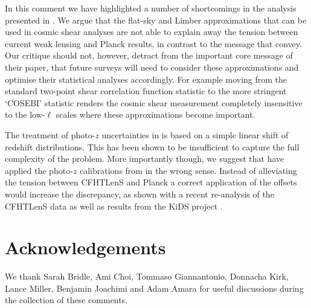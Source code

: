 In this comment we have highlighted a number of shortcomings in the analysis presented in \cite{kitching/etal:2016}.  We argue that the flat-sky and Limber approximations that can be used in cosmic shear analyses are not able to explain away the tension between current weak lensing and Planck results, in contrast to the message that \cite{kitching/etal:2016} convey.  Our critique should not, however, detract from the important core message of their paper, that future surveys will need to consider these approximations and optimise their statistical analyses accordingly.  For example moving from the standard two-point shear correlation function statistic to the more stringent `COSEBI' statistic \citep{schneider/etal:2010} renders the cosmic shear measurement completely insensitive to the low-$\ell$ scales where these approximations become important.  

The treatment of photo-$z$ uncertainties in \cite{kitching/etal:2016} is based on a simple linear shift of redshift distributions. This has been shown to be insufficient to capture the full complexity of the problem.  More importantly though, we suggest that \cite{kitching/etal:2016} have applied the photo-$z$ calibrations from \cite{choi/etal:2016} in the wrong sense. Instead of alleviating the tension between CFHTLenS and Planck a correct application of the offsets would increase the discrepancy, as shown with a recent re-analysis of the CFHTLenS data \citep{joudaki/etal:2016} as well as results from the KiDS project \citep{hildebrandt/etal:2016}.

\section{Acknowledgements}
We thank Sarah Bridle, Ami Choi, Tommaso Giannantonio, Donnacha Kirk, Lance Miller, Benjamin Joachimi and Adam Amara for useful discussions during the collection of these comments.
